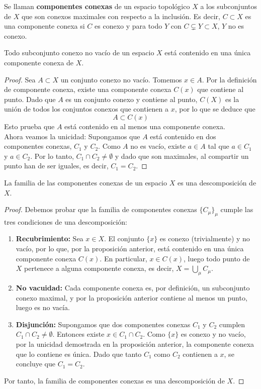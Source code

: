 \begin{definición}
    Se llaman \textbf{componentes conexas} de un espacio topológico $X$ a los subconjuntos de $X$ que son conexos maximales con respecto a la inclusión. Es decir, $C \subset X$ es una componente conexa si $C$ es conexo y para todo $Y$ con $C \subsetneq Y \subset X$, $Y$ no es conexo.
\end{definición}
\begin{proposición}
    Todo subconjunto conexo no vacío de un espacio $X$ está contenido en una única componente conexa de $X$.
\end{proposición}
\begin{proof}
    Sea $A \subset X$ un conjunto conexo no vacío. Tomemos $x \in A$. Por la definición de componente conexa, existe una componente conexa $C(x)$ que contiene al punto. Dado que $A$ es un conjunto conexo y contiene al punto, $C(X)$ es la unión de todos los conjuntos conexos que contienen a $x$, por lo que se deduce que
    $$A \subset C(x)$$
    Esto prueba que $A$ está contenido en al menos una componente conexa. \\
    Ahora veamos la unicidad: Supongamos que $A$ está contenido en dos componentes conexas, $C_1$ y $C_2$. Como $A$ no es vacío, existe $a \in A$ tal que $a \in C_1$ y $a \in C_2$. Por lo tanto, $C_1 \cap C_2 \neq \emptyset$ y dado que son maximales, al compartir un punto han de ser iguales, es decir, $C_1 = C_2$.
\end{proof}
\begin{corolario}
    La familia de las componentes conexas de un espacio $X$ es una descomposición de $X$.
\end{corolario}
\begin{proof}
    Debemos probar que la familia de componentes conexas $\{C_\mu\}_{\mu}$ cumple las tres condiciones de una descomposición:
    \begin{enumerate}
        \item \textbf{Recubrimiento:} Sea $x \in X$. El conjunto $\{x\}$ es conexo (trivialmente) y no vacío, por lo que, por la proposición anterior, está contenido en una única componente conexa $C(x)$. En particular, $x \in C(x)$, luego todo punto de $X$ pertenece a alguna componente conexa, es decir, $X = \bigcup_{\mu} C_\mu$.
        \item \textbf{No vacuidad:} Cada componente conexa es, por definición, un subconjunto conexo maximal, y por la proposición anterior contiene al menos un punto, luego es no vacía.
        \item \textbf{Disjunción:} Supongamos que dos componentes conexas $C_1$ y $C_2$ cumplen $C_1 \cap C_2 \neq \emptyset$. Entonces existe $x \in C_1 \cap C_2$. Como $\{x\}$ es conexo y no vacío, por la unicidad demostrada en la proposición anterior, la componente conexa que lo contiene es única. Dado que tanto $C_1$ como $C_2$ contienen a $x$, se concluye que $C_1 = C_2$.
    \end{enumerate}
    Por tanto, la familia de componentes conexas es una descomposición de $X$.
\end{proof}
